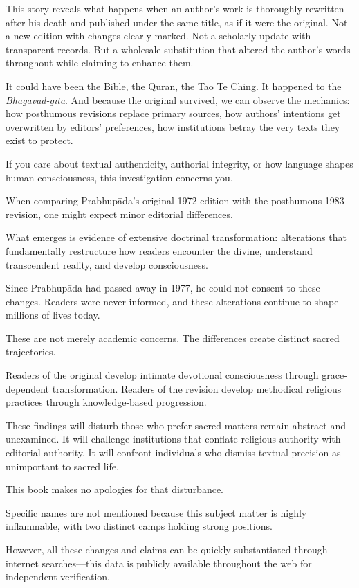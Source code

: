 \documentclass[12pt,twoside]{book}
\begin{document}
This story reveals what happens when an author's work is thoroughly rewritten after his death and published under the same title, as if it were the original. Not a new edition with changes clearly marked. Not a scholarly update with transparent records. But a wholesale substitution that altered the author's words throughout while claiming to enhance them.

It could have been the Bible, the Quran, the Tao Te Ching. It happened to the \emph{Bhagavad-gītā}. And because the original survived, we can observe the mechanics: how posthumous revisions replace primary sources, how authors' intentions get overwritten by editors' preferences, how institutions betray the very texts they exist to protect.

If you care about textual authenticity, authorial integrity, or how language shapes human consciousness, this investigation concerns you.

When comparing Prabhupāda's original 1972 edition with the posthumous 1983 revision, one might expect minor editorial differences.

What emerges is evidence of extensive doctrinal transformation: alterations that fundamentally restructure how readers encounter the divine, understand transcendent reality, and develop consciousness.

Since Prabhupāda had passed away in 1977, he could not consent to these changes. Readers were never informed, and these alterations continue to shape millions of lives today.

These are not merely academic concerns. The differences create distinct sacred trajectories.

Readers of the original develop intimate devotional consciousness through grace-dependent transformation. Readers of the revision develop methodical religious practices through knowledge-based progression.

These findings will disturb those who prefer sacred matters remain abstract and unexamined. It will challenge institutions that conflate religious authority with editorial authority. It will confront individuals who dismiss textual precision as unimportant to sacred life.

This book makes no apologies for that disturbance.

Specific names are not mentioned because this subject matter is highly inflammable, with two distinct camps holding strong positions.

However, all these changes and claims can be quickly substantiated through internet searches—this data is publicly available throughout the web for independent verification.
\end{document}
